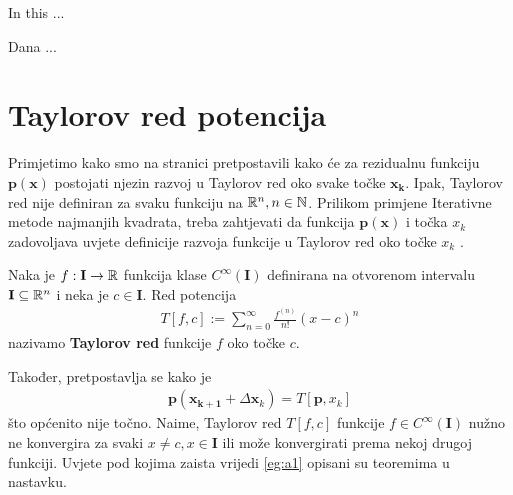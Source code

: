 \documentclass[a4paper,twoside,12pt]{memoir} %
\begin{document}
\begin{summary}
In this ...
\end{summary}


\begin{cv}
Dana ...
\end{cv}

\appendix

\chapter{Taylorov red potencija}\label{appendix:aTay}
Primjetimo kako smo na stranici \pageref{stranica:NGLin} pretpostavili
kako će za rezidualnu funkciju $\mathbf{p}(\mathbf{x})$ postojati njezin 
razvoj u Taylorov red oko svake točke $\mathbf{x_k}$. Ipak,
Taylorov red nije definiran za svaku funkciju na $\mathbb{R}^n, n \in \mathbb{N}$.
Prilikom primjene Iterativne metode najmanjih kvadrata, treba zahtjevati da 
funkcija $\mathbf{p}(\mathbf{x})$ i točka $x_k$ zadovoljava uvjete definicije razvoja funkcije u Taylorov red oko točke $x_k$ \cite{math:tay}.
\begin{defn}
	Naka je $f: \mathbf{I} \to \mathbb{R} $ funkcija klase $C^\infty(\mathbf{I})$ definirana
	na otvorenom intervalu $\mathbf{I} \subseteq \mathbb{R}^n$ i neka je $c \in \mathbf{I}$.
	Red potencija
	\begin{align}
	T \left[f,c\right] := \sum_{n=0}^{\infty} \frac{f^{(n)}}{n!} \left(x - c\right)^n
	\end{align}
	nazivamo \textbf{Taylorov red} funkcije $f$ oko točke $c$.
\end{defn}%

Također,
pretpostavlja se kako je 
\begin{align}\label{eg:a1}
	\mathbf{p}(\mathbf{x_{k+1}}+\Delta \mathbf{x}_k) = T \left[\mathbf{p},x_k \right]
\end{align}
što općenito nije točno.
Naime, Taylorov red $T \left[f,c\right] $ funkcije 
$f \in C^\infty(\mathbf{I})$ nužno ne konvergira za svaki $x \not = c, x \in \mathbf{I}$
ili može konvergirati prema nekoj drugoj funkciji.
Uvjete pod kojima zaista vrijedi \ref{eg:a1} opisani su teoremima u nastavku.
\end{document}
